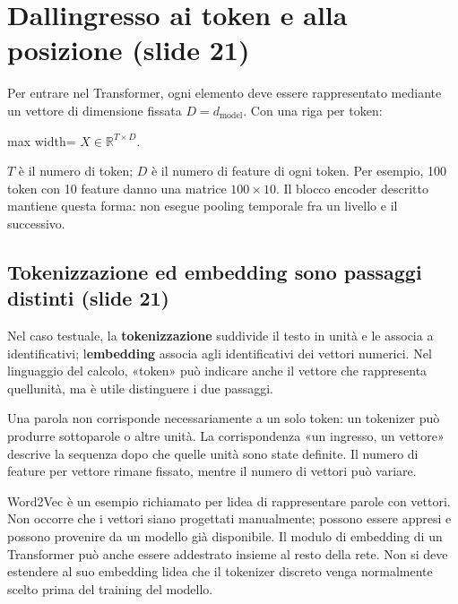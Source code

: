 \documentclass[11pt,a4paper,oneside,openany]{book}
\begin{document}
\section{Dall\textquotesingle ingresso ai token e alla posizione (slide 21)}\label{f04-r296}

Per entrare nel Transformer, ogni elemento deve essere rappresentato mediante un vettore di dimensione fissata \(D=d_{\mathrm{model}}\). Con una riga per token:

\begin{center}
\begin{adjustbox}{max width=\linewidth}
$\displaystyle \boxed{X\in\mathbb R^{T\times D}.}$
\end{adjustbox}
\end{center}

\(T\) è il numero di token; \(D\) è il numero di feature di ogni token. Per esempio, 100 token con 10 feature danno una matrice \(100\times10\). Il blocco encoder descritto mantiene questa forma: non esegue pooling temporale fra un livello e il successivo.

\subsection{Tokenizzazione ed embedding sono passaggi distinti (slide 21)}\label{f04-r304}

Nel caso testuale, la \textbf{tokenizzazione} suddivide il testo in unità e le associa a identificativi; l\textquotesingle{}\textbf{embedding} associa agli identificativi dei vettori numerici. Nel linguaggio del calcolo, «token» può indicare anche il vettore che rappresenta quell\textquotesingle unità, ma è utile distinguere i due passaggi.

Una parola non corrisponde necessariamente a un solo token: un tokenizer può produrre sottoparole o altre unità. La corrispondenza «un ingresso, un vettore» descrive la sequenza dopo che quelle unità sono state definite. Il numero di feature per vettore rimane fissato, mentre il numero di vettori può variare.

Word2Vec è un esempio richiamato per l\textquotesingle idea di rappresentare parole con vettori. Non occorre che i vettori siano progettati manualmente; possono essere appresi e possono provenire da un modello già disponibile. Il modulo di embedding di un Transformer può anche essere addestrato insieme al resto della rete. Non si deve estendere al suo embedding l\textquotesingle idea che il tokenizer discreto venga normalmente scelto prima del training del modello.
\end{document}

